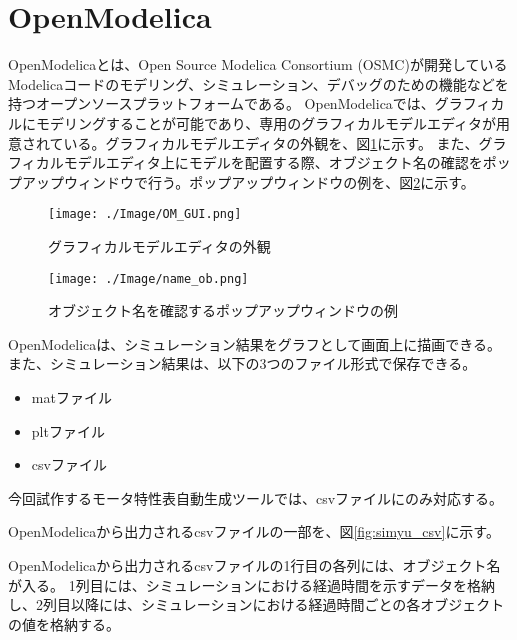 \section{OpenModelica}\label{OM}
OpenModelicaとは、Open Source Modelica Consortium (OSMC)が開発しているModelicaコードのモデリング、シミュレーション、デバッグのための機能などを
持つオープンソースプラットフォームである\cite{fritzson2006openmodelica}。
OpenModelicaでは、グラフィカルにモデリングすることが可能であり、専用のグラフィカルモデルエディタが用意されている。グラフィカルモデルエディタの外観を、図\ref{fig:OM_GUI}に示す。
また、グラフィカルモデルエディタ上にモデルを配置する際、オブジェクト名の確認をポップアップウィンドウで行う。ポップアップウィンドウの例を、図\ref{fig:name_ob}に示す。
\begin{figure}[t]
	\centering
	\texttt{[image: ./Image/OM\_GUI.png]}
	\caption{グラフィカルモデルエディタの外観}
	\label{fig:OM_GUI}
\end{figure}
\begin{figure}[t]
	\centering
	\texttt{[image: ./Image/name\_ob.png]}
	\caption{オブジェクト名を確認するポップアップウィンドウの例}
	\label{fig:name_ob}
\end{figure}
OpenModelicaは、シミュレーション結果をグラフとして画面上に描画できる。また、シミュレーション結果は、以下の3つのファイル形式で保存できる。
\begin{itemize}
    \item matファイル
    \item pltファイル
    \item csvファイル
\end{itemize}

今回試作するモータ特性表自動生成ツールでは、csvファイルにのみ対応する。

OpenModelicaから出力されるcsvファイルの一部を、図\ref{fig:simyu_csv}に示す。

OpenModelicaから出力されるcsvファイルの1行目の各列には、オブジェクト名が入る。
1列目には、シミュレーションにおける経過時間を示すデータを格納し、2列目以降には、シミュレーションにおける経過時間ごとの各オブジェクトの値を格納する。

